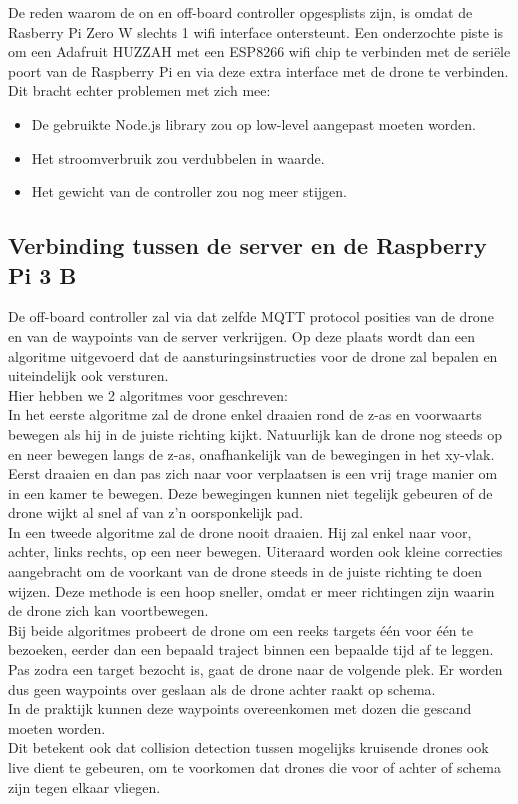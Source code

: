 De reden waarom de on en off-board controller opgesplists zijn, is omdat de Rasberry Pi Zero W slechts 1 wifi interface ontersteunt.
Een onderzochte piste is om een Adafruit HUZZAH met een ESP8266 wifi chip te verbinden met de seri\"ele poort van de Raspberry Pi en via deze extra interface met de drone te verbinden.\\
Dit bracht echter problemen met zich mee:
\begin{itemize}
	\item De gebruikte Node.js library zou op low-level aangepast moeten worden.
	\item Het stroomverbruik zou verdubbelen in waarde.
	\item Het gewicht van de controller zou nog meer stijgen.
\end{itemize}

\subsection{Verbinding tussen de server en de Raspberry Pi 3 B} \label{sec:server_raspberry}
De off-board controller zal via dat zelfde MQTT protocol posities van de drone en van de waypoints van de server verkrijgen.
Op deze plaats wordt dan een algoritme uitgevoerd dat de aansturingsinstructies voor de drone zal bepalen en uiteindelijk ook versturen.\\

Hier hebben we 2 algoritmes voor geschreven:\\
In het eerste algoritme zal de drone enkel draaien rond de z-as en voorwaarts bewegen als hij in de juiste richting kijkt.
Natuurlijk kan de drone nog steeds op en neer bewegen langs de z-as, onafhankelijk van de bewegingen in het xy-vlak.
Eerst draaien en dan pas zich naar voor verplaatsen is een vrij trage manier om in een kamer te bewegen.
Deze bewegingen kunnen niet tegelijk gebeuren of de drone wijkt al snel af van z'n oorsponkelijk pad.\\
In een tweede algoritme zal de drone nooit draaien.
Hij zal enkel naar voor, achter, links rechts, op een neer bewegen.
Uiteraard worden ook kleine correcties aangebracht om de voorkant van de drone steeds in de juiste richting te doen wijzen.
Deze methode is een hoop sneller, omdat er meer richtingen zijn waarin de drone zich kan voortbewegen.\\

Bij beide algoritmes probeert de drone om een reeks targets \'e\'en voor \'e\'en te bezoeken, eerder dan een bepaald traject binnen een bepaalde tijd af te leggen.
Pas zodra een target bezocht is, gaat de drone naar de volgende plek.
Er worden dus geen waypoints over geslaan als de drone achter raakt op schema.\\
In de praktijk kunnen deze waypoints overeenkomen met dozen die gescand moeten worden.\\
Dit betekent ook dat collision detection tussen mogelijks kruisende drones ook live dient te gebeuren, om te voorkomen dat drones die voor of achter of schema zijn tegen elkaar vliegen.

